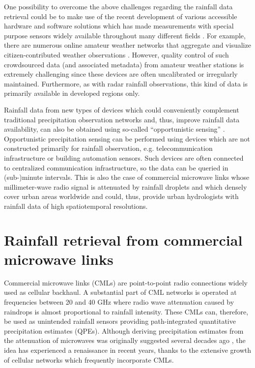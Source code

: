 \documentclass{ctuthesis}\usepackage[]{graphicx}\usepackage[]{color}
\begin{document}
One possibility to overcome the above challenges regarding the rainfall data retrieval could be to make use of the recent development of various accessible hardware and software solutions which has made measurements with special purpose sensors widely available throughout many different fields \citep{swanSensorManiaInternet2012}. For example, there are numerous online amateur weather networks that aggregate and visualize citizen-contributed weather observations \citep{gharesifardBenchmarkingCitizenObservatories2017, devosPotentialUrbanRainfall2017}. However, quality control of such crowdsourced data (and associated metadata) from amateur weather stations is extremely challenging since these devices are often uncalibrated or irregularly maintained. Furthermore, as with radar rainfall observations, this kind of data is primarily available in developed regions only.

Rainfall data from new types of devices which could conveniently complement traditional precipitation observation networks and, thus, improve rainfall data availability, can also be obtained using so-called \enquote{opportunistic sensing} \citep{tauroMeasurementsObservationsXXI2018}. Opportunistic precipitation sensing can be performed using devices which are not constructed primarily for rainfall observation, e.g. telecommunication infrastructure or building automation sensors. Such devices are often connected to centralized communication infrastructure, so the data can be queried in (sub-)minute intervals. This is also the case of commercial microwave links whose millimeter-wave radio signal is attenuated by rainfall droplets and which densely cover urban areas worldwide and could, thus, provide urban hydrologists with rainfall data of high spatiotemporal resolutions.


\section{Rainfall retrieval from commercial microwave links} \label{CMLretrievalTheor}

Commercial microwave links (CMLs) are point-to-point radio connections widely used as cellular backhaul. A substantial part of CML networks is operated at frequencies between 20 and 40 GHz where radio wave attenuation caused by raindrops is almost proportional to rainfall intensity. These CMLs can, therefore, be used as unintended rainfall sensors providing path-integrated quantitative precipitation estimates (QPEs). Although deriving precipitation estimates from the attenuation of microwaves was originally suggested several decades ago \citep{atlasPathAreaIntegratedRainfall1977}, the idea has experienced a renaissance in recent years, thanks to the extensive growth of cellular networks \citep{messer2006environmental, leijnseRainfallMeasurementUsing2007} which frequently incorporate CMLs.
\end{document}
